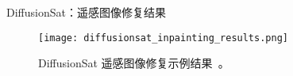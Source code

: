 \begin{refsection}
\begin{frame}{DiffusionSat：遥感图像修复结果}
  \begin{figure}
    \centering
    \texttt{[image: diffusionsat\_inpainting\_results.png]}
    \caption[]{\scriptsize DiffusionSat 遥感图像修复示例结果~\parencite{diffusionset2024}。}
  \end{figure}
  \bottomleftrefs
\end{frame}
\end{refsection}